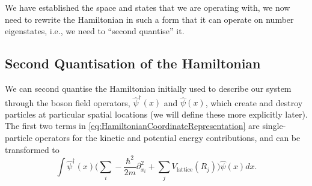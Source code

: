 \documentclass[a4paper,10pt]{article}
\begin{document}
We have established the space and states that we are operating with, we now need to rewrite the Hamiltonian in such a form that it can operate on number eigenstates, i.e., we need to
``second quantise'' it.

\subsection{Second Quantisation of the Hamiltonian}
We can second quantise the Hamiltonian initially used to describe our system through the boson field operators, $\hat{\psi}^{\dagger}(x)$ and $\hat{\psi}(x)$, which create and destroy 
particles at particular spatial locations (we will define these more explicitly later). The first two terms in \eqref{eq:HamiltonianCoordinateRepresentation} are single-particle
operators for the kinetic and potential energy contributions, and can be transformed to
\begin{equation}
 \int  \hat{\psi}^{\dagger}(x) \bigg(  \sum_{i}-\frac{\hbar^{2}}{2m}  \partial_{x_{i}}^2+\sum_{j}V_{\text{lattice}}(R_{j})  \bigg)    \hat{\psi}(x)dx.
\end{equation}
\end{document}
